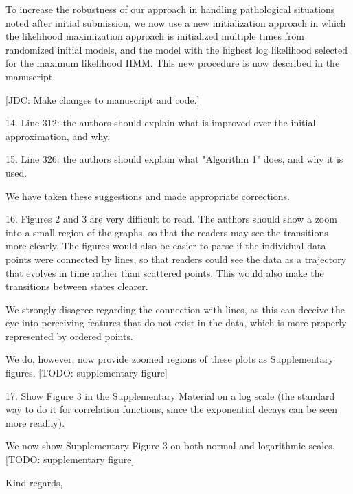 \documentclass[ucb,qb3,10pt,fullfrom]{ucletter}
\begin{document}
\begin{letter}{}
To increase the robustness of our approach in handling pathological situations noted after initial submission, we now use a new initialization approach in which the likelihood maximization approach is initialized multiple times from randomized initial models, and the model with the highest log likelihood selected for the maximum likelihood HMM. 
This new procedure is now described in the manuscript.

{\color{blue}[JDC: Make changes to manuscript and code.]}

\color{red}
14. Line 312: the authors should explain what is improved over the initial approximation, and why. 

15. Line 326: the authors should explain what "Algorithm 1" does, and why it is used.
\color{black}

We have taken these suggestions and made appropriate corrections.

\color{red}
16. Figures 2 and 3 are very difficult to read. The authors should show a zoom into a small region of the graphs, so that the readers may see the transitions more clearly. The figures would also be easier to parse if the individual data points were connected by lines, so that readers could see the data as a trajectory that evolves in time rather than scattered points. This would also make the transitions between states clearer.
\color{black}

We strongly disagree regarding the connection with lines, as this can deceive the eye into perceiving features that do not exist in the data, which is more properly represented by ordered points.

We do, however, now provide zoomed regions of these plots as Supplementary figures. {\color{blue} [TODO: supplementary figure]}

\color{red}
17. Show Figure 3 in the Supplementary Material on a log scale (the standard way to do it for correlation functions, since the exponential decays can be seen more readily).
\color{black}

We now show Supplementary Figure 3 on both normal and logarithmic scales. {\color{blue} [TODO: supplementary figure]}




\closing{Kind regards,}
\end{letter}
\end{document}
